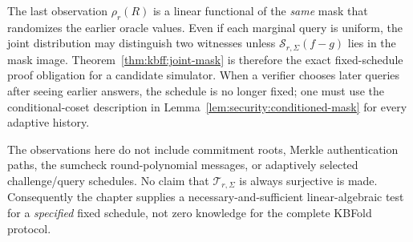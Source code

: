 \begin{remark}
The last observation $\rho_r(R)$ is a linear functional of the
\emph{same} mask that randomizes the earlier oracle values.
Even if each marginal query is uniform, the joint distribution
may distinguish two witnesses unless
$\mathcal S_{r,\Sigma}(f-g)$ lies in the mask image.
Theorem~\ref{thm:kbff:joint-mask} is therefore the exact
fixed-schedule proof obligation for a candidate simulator.
When a verifier chooses later queries after seeing earlier
answers, the schedule is no longer fixed; one must use the
conditional-coset description in
Lemma~\ref{lem:security:conditioned-mask} for every adaptive history.
\end{remark}

\begin{remark}
The observations here do not include commitment roots, Merkle
authentication paths, the sumcheck round-polynomial messages, or
adaptively selected challenge/query schedules. No claim that
$\mathcal T_{r,\Sigma}$ is always surjective is made.
Consequently the chapter supplies a necessary-and-sufficient
linear-algebraic test for a \emph{specified} fixed schedule,
not zero knowledge for the complete KBFold protocol.
\end{remark}
